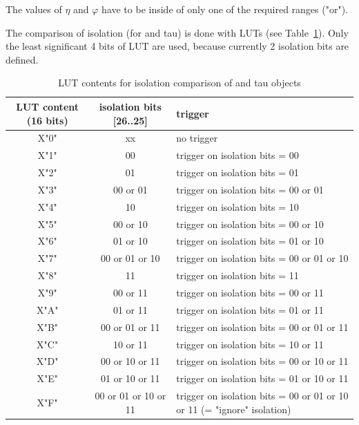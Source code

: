 The values of $\eta$ and $\varphi$ have to be inside of only one of the required ranges ("or").

The comparison of isolation (for \egamma and tau) is done with LUTs (see Table~\ref{tab:gtl:calo_lut_iso}).
Only the least significant 4 bits of LUT are used, because currently 2 isolation bits are defined. 

\begin{table}[htdp]
\begin{center}
\begin{tabular}{|c|c|p{}|}\hline
LUT content (16 bits) & isolation bits [26..25] & trigger \\\hline\hline
X"0" & xx & no trigger\\\hline
X"1" & 00 & trigger on isolation bits = 00\\\hline
X"2" & 01 & trigger on isolation bits = 01\\\hline
X"3" & 00 or 01 & trigger on isolation bits = 00 or 01\\\hline
X"4" & 10 & trigger on isolation bits = 10\\\hline
X"5" & 00 or 10 & trigger on isolation bits = 00 or 10\\\hline
X"6" & 01 or 10 & trigger on isolation bits = 01 or 10\\\hline
X"7" & 00 or 01 or 10 & trigger on isolation bits = 00 or 01 or 10\\\hline
X"8" & 11 & trigger on isolation bits = 11\\\hline
X"9" & 00 or 11 & trigger on isolation bits = 00 or 11\\\hline
X"A" & 01 or 11 & trigger on isolation bits = 01 or 11\\\hline
X"B" & 00 or 01 or 11 & trigger on isolation bits = 00 or 01 or 11\\\hline
X"C" & 10 or 11 & trigger on isolation bits = 10 or 11\\\hline
X"D" & 00 or 10 or 11 & trigger on isolation bits = 00 or 10 or 11\\\hline
X"E" & 01 or 10 or 11 & trigger on isolation bits = 01 or 10 or 11\\\hline
X"F" & 00 or 01 or 10 or 11 & trigger on isolation bits = 00 or 01 or 10 or 11 (= "ignore" isolation)\\\hline
\end{tabular}
\end{center}
\caption{LUT contents for isolation comparison of \egamma and tau objects}
\label{tab:gtl:calo_lut_iso}
\end{table}

